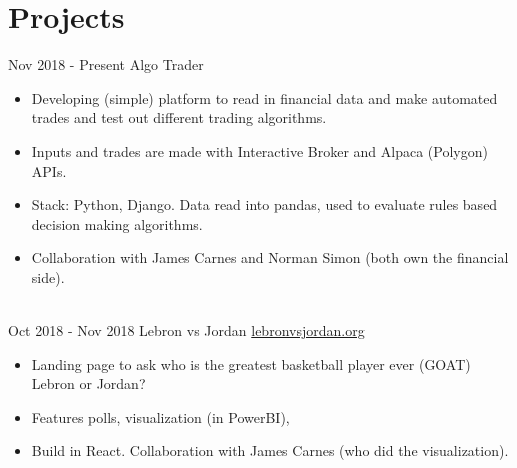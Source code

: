 \documentclass[letterpaper]{twentysecondcv} %
\begin{document}
\section{Projects}
\begin{twenty}
\twentyitem
    {Nov 2018}
    {- Present}
    {Algo Trader}
    {}
    {}
    {
        \begin{itemize}
            \item Developing (simple) platform to read in financial data and make automated trades and test out different trading algorithms.
            \item Inputs and trades are made with Interactive Broker and Alpaca (Polygon) APIs.
            \item Stack: Python, Django.  Data read into pandas, used to evaluate rules based decision making algorithms.
            \item Collaboration with James Carnes and Norman Simon (both own the financial side).
        \end{itemize}
    }
    \\

\twentyitem
    {Oct 2018}
    {- Nov 2018}
    {Lebron vs Jordan}
    {\href{https://www.lebronvsjordan.org/}{lebronvsjordan.org}}
    {
        \begin{itemize}
            \item Landing page to ask who is the greatest basketball player ever (GOAT) Lebron or Jordan?
            \item Features polls, visualization (in PowerBI), 
            \item Build in React.  Collaboration with James Carnes (who did the visualization).
        \end{itemize}
    }

\end{twenty}
\end{document}
